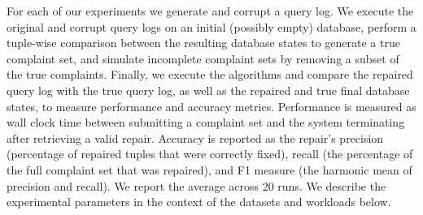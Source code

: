 For each of our experiments we generate and corrupt a query log. 
We execute the original and corrupt query logs on an initial (possibly empty) database,
perform a tuple-wise comparison between the resulting database states to generate a true complaint set,
and simulate incomplete complaint sets by removing a subset of the true complaints.
Finally, we execute the algorithms and compare the repaired query log with the true query log, as well as the repaired and true
final database states, to measure performance and accuracy metrics.
Performance is measured as wall clock
time between submitting a complaint set and the system terminating after retrieving a valid repair.  
Accuracy is reported as the repair's precision (percentage of repaired tuples that were correctly fixed), 
recall (the percentage of the full complaint set that was repaired), 
and F1 measure (the harmonic mean of precision and recall).
We report the average across 20 runs.
We describe the experimental parameters in the context of the datasets and workloads below.

